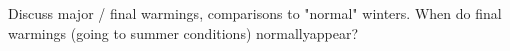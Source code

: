 Discuss major / final warmings, comparisons to "normal" winters. When do final warmings (going to summer conditions) normallyappear?